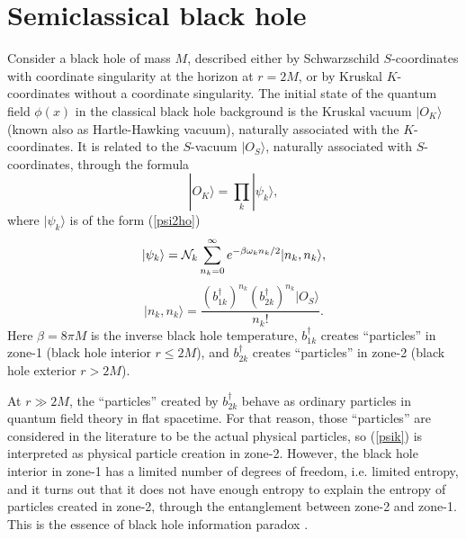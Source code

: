\documentclass[12pt]{article}
\begin{document}
\section{Semiclassical black hole}

Consider a black hole of mass $M$, described either by Schwarzschild $S$-coordinates
with coordinate singularity at the horizon at $r=2M$, or by Kruskal $K$-coordinates without a coordinate singularity.
The initial state of the quantum field $\phi(x)$ in the 
classical black hole background is the Kruskal vacuum $|O_K\rangle$ (known also as Hartle-Hawking vacuum),
naturally associated with the $K$-coordinates. It is related to the $S$-vacuum $|O_S\rangle$, naturally associated 
with $S$-coordinates, through the formula \cite{bd}
\begin{equation}\label{0_K}
 |O_K\rangle = \prod_k |\psi_k\rangle ,
\end{equation}
where $|\psi_k\rangle$ is of the form (\ref{psi2ho})
\begin{equation}\label{psik}
 |\psi_k\rangle = {\cal N}_k\sum_{n_k=0}^{\infty} e^{-\beta\omega_k n_k/2} |n_k,n_k\rangle ,
\end{equation}
\begin{equation}
 |n_k,n_k\rangle = \frac{ (b_{1k}^\dagger)^{n_k}  (b_{2k}^\dagger)^{n_k}  |O_S\rangle}{n_k!} .
\end{equation}
Here $\beta=8\pi M$ is the inverse black hole temperature, $b_{1k}^\dagger$ creates ``particles''
in zone-1 (black hole interior $r\leq 2M$), and $b_{2k}^\dagger$ creates ``particles''
in zone-2 (black hole exterior $r> 2M$). 

At $r\gg 2M$, the ``particles'' created by $b_{2k}^\dagger$ behave as ordinary particles in quantum field theory in flat spacetime.
For that reason, those ``particles'' are considered in the literature to be the actual physical particles, 
so (\ref{psik}) is interpreted
as physical particle creation in zone-2. However, the black hole interior in zone-1 has a limited number of degrees of freedom,
i.e. limited entropy, and it turns out that it does not have enough entropy to explain the entropy of particles created in zone-2,
through the entanglement between zone-2 and zone-1. This is the essence of black hole information paradox 
\cite{gid,math1,math2,hoss,dundar,harlow,polchinski,chakra,marolf,fabbri}.
\end{document}
